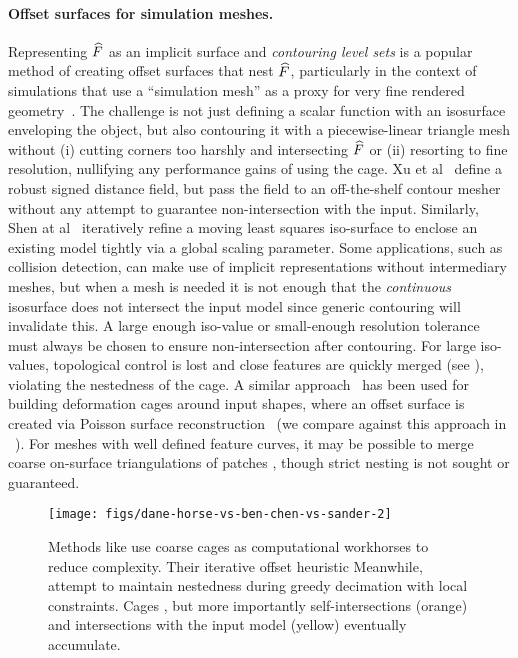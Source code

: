 \paragraph{Offset surfaces for simulation meshes.}
%
Representing $\widehat{F}$ as an implicit surface and \emph{contouring level
sets} is a popular method of creating offset surfaces that nest $\widehat{F}$,
particularly in the context of simulations that use a ``simulation mesh'' as a
proxy for very fine rendered geometry~\cite{Campen:2010}. The challenge is not
just defining a scalar function with an isosurface enveloping the object, but
also contouring it with a piecewise-linear triangle mesh without (i) cutting
corners too harshly and intersecting $\widehat{F}$ or (ii) resorting to fine
resolution, nullifying any performance gains of using the cage.
%
Xu et al~ define a robust signed distance field, but
pass the field to an off-the-shelf contour mesher without any attempt to
guarantee non-intersection with the input.  Similarly, Shen at
al~ iteratively refine a moving least squares
iso-surface to enclose an existing model tightly via a global scaling
parameter.
%
Some applications, such as collision detection, can make use of implicit
representations without intermediary meshes,
%
but when a mesh is needed it is not enough that the \emph{continuous}
isosurface does not intersect the input model since generic contouring will
invalidate this.
%
A large enough iso-value or
small-enough resolution tolerance must always be chosen to ensure
non-intersection after contouring. For large iso-values, topological control is
lost and close features are quickly merged (see ),
violating the nestedness of the cage. A similar
approach~\cite{Ben-Chen:2009:SDT} has been used for building deformation cages
around input shapes, where an offset surface is created via Poisson surface
reconstruction~\cite{PoissonSurfaceReconstruction06} (we compare against this
approach in ~). 
%
For meshes with well defined feature curves, it may be possible to merge coarse
on-surface triangulations of patches \cite{Xian:2013}, though strict nesting is
not sought or guaranteed.

\begin{figure}
  \texttt{[image: figs/dane-horse-vs-ben-chen-vs-sander-2]}
  \caption{Methods like \protect\cite{Ben-Chen:2009:SDT} use coarse cages as
  computational workhorses to reduce complexity. Their iterative offset
  heuristic 
  Meanwhile, \protect\cite{Sander:2000:SC} attempt to
  maintain nestedness during greedy decimation with local constraints. Cages
  , but more importantly self-intersections (orange) and
  intersections with the input model (yellow) eventually accumulate.}
  \label{fig:dane-vs-ben-chen}
  \vspace*{-5mm}
\end{figure}

